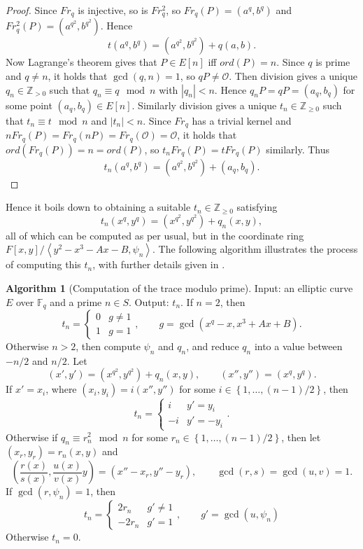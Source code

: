 \documentclass{article}
\newcommand{\F}{\mathbb{F}}
\newcommand{\Z}{\mathbb{Z}}
\newcommand{\rb}[1]{\left( #1 \right)}
\renewcommand{\sb}[1]{\left[ #1 \right]}
\newcommand{\cb}[1]{\left\{ #1 \right\}}
\newcommand{\ab}[1]{\left\langle #1 \right\rangle}
\newcommand{\abs}[1]{\left\lvert #1 \right\rvert}
\theoremstyle{definition}\newtheorem*{definition}{Definition}
\theoremstyle{definition}\newtheorem*{example}{Example}
\theoremstyle{definition}\newtheorem*{remark}{Remark}
\newtheorem{algorithm}[proposition]{Algorithm}
\begin{document}
\begin{proof}
Since $ Fr_q $ is injective, so is $ Fr_q^2 $, so $ Fr_q\rb{P} = \rb{a^q, b^q} $ and $ Fr_q^2\rb{P} = \rb{a^{q^2}, b^{q^2}} $. Hence
$$ t\rb{a^q, b^q} = \rb{a^{q^2}, b^{q^2}} + q\rb{a, b}. $$
Now Lagrange's theorem gives that $ P \in E\sb{n} $ iff $ ord\rb{P} = n $. Since $ q $ is prime and $ q \ne n $, it holds that $ \gcd\rb{q, n} = 1 $, so $ qP \ne \mathcal{O} $. Then division gives a unique $ q_n \in \Z_{> 0} $ such that $ q_n \equiv q \mod n $ with $ \abs{q_n} < n $. Hence $ q_nP = qP = \rb{a_q, b_q} $ for some point $ \rb{a_q, b_q} \in E\sb{n} $. Similarly division gives a unique $ t_n \in \Z_{\ge 0} $ such that $ t_n \equiv t \mod n $ and $ \abs{t_n} < n $. Since $ Fr_q $ has a trivial kernel and $ nFr_q\rb{P} = Fr_q\rb{nP} = Fr_q\rb{\mathcal{O}} = \mathcal{O} $, it holds that $ ord\rb{Fr_q\rb{P}} = n = ord\rb{P} $, so $ t_nFr_q\rb{P} = tFr_q\rb{P} $ similarly. Thus
$$ t_n\rb{a^q, b^q} = \rb{a^{q^2}, b^{q^2}} + \rb{a_q, b_q}. $$
\end{proof}

Hence it boils down to obtaining a suitable $ t_n \in \Z_{\ge 0} $ satisfying
$$ t_n\rb{x^q, y^q} = \rb{x^{q^2}, y^{q^2}} + q_n\rb{x, y}, $$
all of which can be computed as per usual, but in the coordinate ring $ F\sb{x, y} / \ab{y^2 - x^3 - Ax - B, \psi_n} $. The following algorithm illustrates the process of computing this $ t_n $, with further details given in \cite{crypto}.

\begin{algorithm}[Computation of the trace modulo prime]
Input: an elliptic curve $ E $ over $ \F_q $ and a prime $ n \in S $. Output: $ t_n $. If $ n = 2 $, then
$$ t_n = \begin{cases} 0 & g \ne 1 \\ 1 & g = 1 \end{cases}, \qquad g = \gcd\rb{x^q - x, x^3 + Ax + B}. $$
Otherwise $ n > 2 $, then compute $ \psi_n $ and $ q_n $, and reduce $ q_n $ into a value between $ -n / 2 $ and $ n / 2 $. Let
$$ \rb{x', y'} = \rb{x^{q^2}, y^{q^2}} + q_n\rb{x, y}, \qquad \rb{x'', y''} = \rb{x^q, y^q}. $$
If $ x' = x_i $, where $ \rb{x_i, y_i} = i\rb{x'', y''} $ for some $ i \in \cb{1, \dots, \rb{n - 1} / 2} $, then
$$ t_n = \begin{cases} i & y' = y_i \\ -i & y' = -y_i \end{cases}. $$
Otherwise if $ q_n \equiv r_n^2 \mod n $ for some $ r_n \in \cb{1, \dots, \rb{n - 1} / 2} $, then let $ \rb{x_r, y_r} = r_n\rb{x, y} $ and
$$ \rb{\dfrac{r\rb{x}}{s\rb{x}}, \dfrac{u\rb{x}}{v\rb{x}}y} = \rb{x'' - x_r, y'' - y_r}, \qquad \gcd\rb{r, s} = \gcd\rb{u, v} = 1. $$
If $ \gcd\rb{r, \psi_n} = 1 $, then
$$ t_n = \begin{cases} 2r_n & g' \ne 1 \\ -2r_n & g' = 1 \end{cases}, \qquad g' = \gcd\rb{u, \psi_n} $$
Otherwise $ t_n = 0 $.
\end{algorithm}
\end{document}
